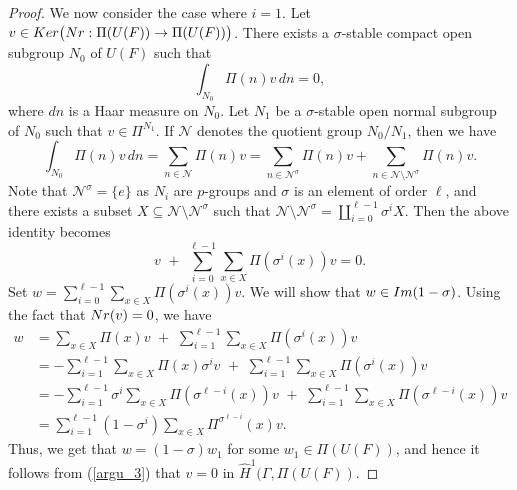\documentclass[10pt,a4paper]{amsart}
\begin{document}
\begin{proof}
We now consider the case where $i=1$. 
Let $v\in {\rm Ker}\big({\rm Nr}:\Pi(U(F))\rightarrow \Pi(U(F))\big)$. There 
exists a $\sigma$-stable compact open subgroup $N_0$ of $U(F)$ such that
$$ \int_{N_0} \Pi(n)v\,dn = 0, $$
where $dn$ is a Haar measure on $N_0$. Let $N_1$ be a $\sigma$-stable
open normal subgroup of $N_0$ such that $v\in \Pi^{N_1}$. If
$\mathcal{N}$ denotes the quotient group $N_0/N_1$, then we have
$$ \int_{N_0} \Pi(n)v\,dn = \sum_{n\in \mathcal{N}} \Pi(n)v 
= \sum_{n\in \mathcal{N}^\sigma}\Pi(n)v + \sum_{n\in \mathcal{N}\setminus 
\mathcal{N}^\sigma}\Pi(n)v. $$
Note that $\mathcal{N}^\sigma = \{e\}$ as $N_i$ are $p$-groups and $\sigma$ 
is an element of order $\ell$, and there exists a subset $X\subseteq 
\mathcal{N}\setminus \mathcal{N}^\sigma$ such that $\mathcal{N}\setminus 
\mathcal{N}^\sigma = \coprod_{i=0}^{\ell-1}\sigma^iX$. Then the above 
identity becomes
\begin{equation}\label{argu_3}
v \,\,+ \,\,\sum_{i=0}^{\ell-1}\sum_{x\in X}\Pi(\sigma^i(x))v = 0.
\end{equation}
Set $w = \sum_{i=0}^{\ell-1}\sum_{x\in X}\Pi(\sigma^i(x))v$. We will show 
that $w\in {\rm Im}(1-\sigma)$. Using the fact that ${\rm Nr}(v) = 0$, we have
\begin{align*}
w 
&= \sum_{x\in X}\Pi(x)v \,\,+\,\, \sum_{i=1}^{\ell-1}\sum_{x\in X} \Pi(\sigma^i(x))v\\
&= -\sum_{i=1}^{\ell-1}\sum_{x\in X}
\Pi(x)\sigma^{i}v \,\,+\,\, \sum_{i=1}^{\ell-1}\sum_{x\in X} \Pi(\sigma^i(x)) v\\
&= -\sum_{i=1}^{\ell-1}\sigma^i\sum_{x\in X} \Pi(\sigma^{\ell-i}(x))v 
\,\,+\,\, \sum_{i=1}^{\ell-1}\sum_{x\in X}
\Pi(\sigma^{\ell-i}(x)) v\\
&= \sum_{i=1}^{\ell-1}(1-\sigma^i)\sum_{x\in X}\Pi^{\sigma^{\ell-i}}(x)v.
\end{align*}
Thus, we get that $w = (1-\sigma)w_1$ for some $w_1\in \Pi(U(F))$, and
hence it follows from (\ref{argu_3}) that $v = 0$ in
$\widehat{H}^1(\Gamma, \Pi(U(F))$.
\end{proof}
\end{document}
